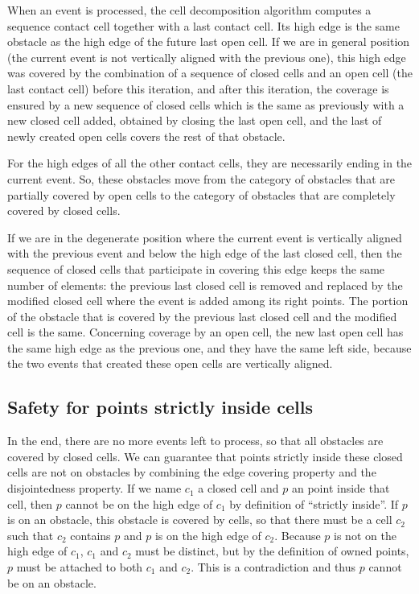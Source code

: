 \documentclass[a4paper, USenglish, cleveref, autoref, thm-restate, final]{lipics-v2021}
\begin{document}
When an event is processed, the cell decomposition algorithm computes
a sequence contact cell together with a last contact cell.  Its high edge
is the same obstacle as the high edge of the future last open cell.  If we
are in general position (the current event is not vertically aligned
with the previous one), this high
edge was covered by the combination of a sequence of closed cells and
an open cell (the last contact cell) before this iteration,
and after this iteration, the coverage is ensured by a new sequence
of closed cells which is the same as previously with a new closed cell added,
obtained by closing the last open cell, and the last of newly created open
cells covers the rest of that obstacle.

For the high edges of all the other contact cells, they are
necessarily ending in the current event.  So, these obstacles move from
the category of obstacles that are partially covered by open cells to
the category of obstacles that are completely covered by closed cells.

If we are in the degenerate position where the current event is
vertically aligned with the previous event and below the high edge of the
last closed cell, then the sequence of closed cells that participate
in covering this edge keeps the same number of elements: the previous last
closed cell is removed and replaced by the modified closed cell
where the event is added among its right points.  The portion of the
obstacle that is covered by the previous last closed cell and the
modified cell is the same.  Concerning coverage by an open cell, the
new last open cell has the same high edge as the previous one, and
they have the same left side, because the two events that created
these open cells are vertically aligned.
\subsection{Safety for points strictly inside cells}
In the end, there are no more events left to process, so that all
obstacles are covered by closed cells.  
We can guarantee that points strictly inside these closed cells are not
on obstacles by combining the edge covering property and the
disjointedness property.  If we name \(c_1\) a closed cell and \(p\) an
point inside that cell, then \(p\) cannot be on the high edge of
\(c_1\) by definition of ``strictly inside''.  If \(p\) is on an
obstacle, this obstacle is covered by cells, so that there must be a
cell \(c_2\) such that \(c_2\) contains \(p\) and \(p\) is on the high
edge of \(c_2\).  Because \(p\) is not on the high edge of \(c_1\),
\(c_1\) and \(c_2\) must be distinct, but by the definition of
owned points, \(p\) must be attached to both \(c_1\) and \(c_2\).  This
is a contradiction and thus \(p\) cannot be on an obstacle.
\end{document}
